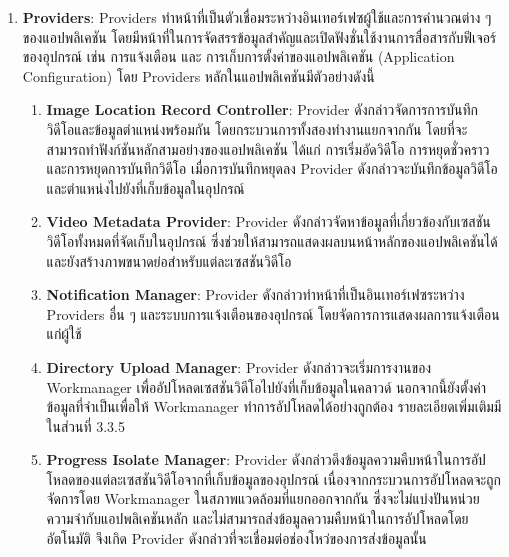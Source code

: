 \begin{enumerate}
    \item \textbf{Providers}: Providers ทำหน้าที่เป็นตัวเชื่อมระหว่างอินเทอร์เฟซผู้ใช้และการคำนวณต่าง ๆ ของแอปพลิเคชัน โดยมีหน้าที่ในการจัดสรรข้อมูลสำคัญและเปิดฟังชั่นใช้งานการสื่อสารกับฟีเจอร์ของอุปกรณ์ เช่น การแจ้งเตือน และ การเก็บการตั้งค่าของแอปพลิเคชัน (Application Configuration) โดย Providers หลักในแอปพลิเคชันมีตัวอย่างดังนี้
    \begin{enumerate}
        \item \textbf{Image Location Record Controller}: Provider ดังกล่าวจัดการการบันทึกวิดีโอและข้อมูลตำแหน่งพร้อมกัน โดยกระบวนการทั้งสองทำงานแยกจากกัน โดยที่จะสามารถทำฟังก์ชันหลักสามอย่างของแอปพลิเคชัน ได้แก่ การเริ่มอัดวิดีโอ การหยุดชั่วคราว และการหยุดการบันทึกวิดีโอ เมื่อการบันทึกหยุดลง Provider ดังกล่าวจะบันทึกข้อมูลวิดีโอและตำแหน่งไปยังที่เก็บข้อมูลในอุปกรณ์
        \item \textbf{Video Metadata Provider}: Provider ดังกล่าวจัดหาข้อมูลที่เกี่ยวข้องกับเซสชันวิดีโอทั้งหมดที่จัดเก็บในอุปกรณ์ ซึ่งช่วยให้สามารถแสดงผลบนหน้าหลักของแอปพลิเคชันได้ และยังสร้างภาพขนาดย่อสำหรับแต่ละเซสชันวิดีโอ  
        \item \textbf{Notification Manager}: Provider ดังกล่าวทำหน้าที่เป็นอินเทอร์เฟซระหว่าง Providers อื่น ๆ และระบบการแจ้งเตือนของอุปกรณ์ โดยจัดการการแสดงผลการแจ้งเตือนแก่ผู้ใช้  
        \item \textbf{Directory Upload Manager}: Provider ดังกล่าวจะเริ่มการงานของ Workmanager เพื่ออัปโหลดเซสชันวิดีโอไปยังที่เก็บข้อมูลในคลาวด์ นอกจากนี้ยังตั้งค่าข้อมูลที่จำเป็นเพื่อให้ Workmanager ทำการอัปโหลดได้อย่างถูกต้อง รายละเอียดเพิ่มเติมมีในส่วนที่ 3.3.5 %
        \item \textbf{Progress Isolate Manager}: Provider ดังกล่าวดึงข้อมูลความคืบหน้าในการอัปโหลดของแต่ละเซสชันวิดีโอจากที่เก็บข้อมูลของอุปกรณ์ เนื่องจากกระบวนการอัปโหลดจะถูกจัดการโดย Workmanager ในสภาพแวดล้อมที่แยกออกจากกัน ซึ่งจะไม่แบ่งปันหน่วยความจำกับแอปพลิเคชันหลัก \cite{workmanager-doc} และไม่สามารถส่งข้อมูลความคืบหน้าในการอัปโหลดโดยอัตโนมัติ จึงเกิด Provider ดังกล่าวที่จะเชื่อมต่อช่องโหว่ของการส่งข้อมูลนั้น
    \end{enumerate}
    

\end{enumerate}
